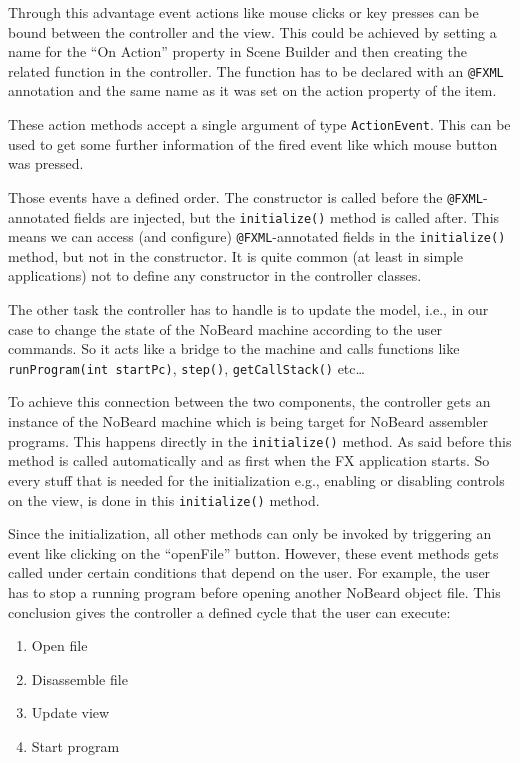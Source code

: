 Through this advantage event actions like mouse clicks or key presses can be bound between the controller and the view. This could be achieved by setting a name for the ``On Action'' property in Scene Builder and then creating the related function in the controller. The function has to be declared with an \texttt{@FXML} annotation and the same name as it was set on the action property of the item.

These action methods accept a single argument of type \texttt{ActionEvent}. This can be used to get some further information of the fired event like which mouse button was pressed.

Those events have a defined order. The constructor is called before the \texttt{@FXML}-annotated fields are injected, but the \texttt{initialize()} method is called after. This means we can access (and configure) \texttt{@FXML}-annotated fields in the \texttt{initialize()} method, but not in the constructor. It is quite common (at least in simple applications) not to define any constructor in the controller classes.

The other task the controller has to handle is to update the model, i.e., in our case to change the state of the NoBeard machine according to the user commands. So it acts like a bridge to the machine and calls functions like \texttt{runProgram(int startPc)}, \texttt{step()}, \texttt{getCallStack()} etc\ldots

To achieve this connection between the two components, the controller gets an instance of the NoBeard machine which is being target for NoBeard assembler programs. This happens directly in the \texttt{initialize()} method. As said before this method is called automatically and as first when the FX application starts. So every stuff that is needed for the initialization e.g., enabling or disabling controls on the view, is done in this \texttt{initialize()} method.

Since the initialization, all other methods can only be invoked by triggering an event like clicking on the ``openFile'' button. However, these event methods gets called under certain conditions that depend on the user. For example, the user has to stop a running program before opening another NoBeard object file. This conclusion gives the controller a defined cycle that the user can execute:
\begin{enumerate}
\item Open file
\item Disassemble file
\item Update view
\item Start program
\end{enumerate}


